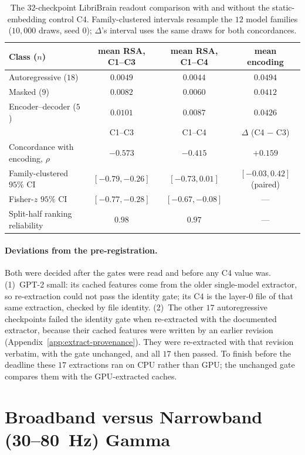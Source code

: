\documentclass{article}
\begin{document}
\begin{table}[h]
\centering\small
\begin{tabular}{@{}lccc@{}}
\toprule
Class ($n$) & mean RSA, C1--C3 & mean RSA, C1--C4 & mean encoding \\
\midrule
Autoregressive ($18$) & $0.0049$ & $0.0044$ & $0.0494$ \\
Masked ($9$) & $0.0082$ & $0.0060$ & $0.0412$ \\
Encoder--decoder ($5$) & $0.0101$ & $0.0087$ & $0.0426$ \\
\midrule
 & C1--C3 & C1--C4 & $\Delta$ (C4 $-$ C3) \\
\midrule
Concordance with encoding, $\rho$ & $-0.573$ & $-0.415$ & $+0.159$ \\
Family-clustered $95\%$ CI & $[-0.79, -0.26]$ & $[-0.73, 0.01]$ & $[-0.03, 0.42]$ (paired) \\
Fisher-$z$ $95\%$ CI & $[-0.77, -0.28]$ & $[-0.67, -0.08]$ & --- \\
Split-half ranking reliability & $0.98$ & $0.97$ & --- \\
\bottomrule
\end{tabular}
\caption{The $32$-checkpoint LibriBrain readout comparison with and without the static-embedding
control C4. Family-clustered intervals resample the $12$ model families ($10{,}000$ draws, seed $0$);
$\Delta$'s interval uses the same draws for both concordances.}
\label{tab:c4}
\end{table}

\paragraph{Deviations from the pre-registration.} Both were decided after the gates were read and
before any C4 value was. (1)~GPT-2 small: its cached features come from the older single-model
extractor, so re-extraction could not pass the identity gate; its C4 is the layer-0 file of that
same extraction, checked by file identity. (2)~The other $17$ autoregressive checkpoints failed the
identity gate when re-extracted with the documented extractor, because their cached features were
written by an earlier revision (Appendix~\ref{app:extract-provenance}). They were re-extracted with
that revision verbatim, with the gate unchanged, and all $17$ then passed. To finish before the
deadline these $17$ extractions ran on CPU rather than GPU; the unchanged gate compares them with the
GPU-extracted caches.

\section{Broadband versus Narrowband (30--80~Hz) Gamma}\label{sec:broadband}
\end{document}
